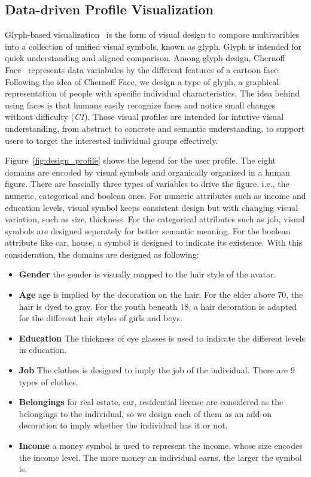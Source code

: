 \subsection{Data-driven Profile Visualization}

Glyph-based visualization~\cite{borgo2013glyph} is the form of visual design to compose multivaribles into a collection of unified visual symbols, known as glyph. Glyph is intended for quick understanding and aligned comparison. Among glyph design, Chernoff Face~\cite{chernoff1973use} represents data variabules by the different features of a cartoon face. Following the idea of Chernoff Face, we design a type of glyph, a graphical representation of people with specific individual characteristics. The idea behind using faces is that humans easily recognize faces and notice small changes without difficulty (\textit{C1}). Those visual profiles are intended for intutive visual understanding, from abstract to concrete and semantic understanding, to support users to target the interested individual groups effectively.

Figure~\ref{fig:design_profile} shows the legend for the user profile. The eight domains are encoded by visual symbols and organically organized in a human figure. There are bascially three types of variables to drive the figure, i.e., the numeric, categorical and boolean ones. For numeric attributes such as income and education levels, visual symbol keeps consistent design but with changing visual variation, such as size, thickness. For the categorical attributes such as job, visual symbols are designed seperately for better semantic meaning. For the boolean attribute like car, house, a symbol is designed to indicate its existence. With this consideration, the domains are designed as following:



\begin{itemize}
\item \textbf{Gender} the gender is visually mapped to the hair style of the avatar. 
\item \textbf{Age} age is implied by the decoration on the hair. For the elder above 70, the hair is dyed to gray. For the youth beneath 18, a hair decoration is adapted for the different hair styles of girls and boys.
\item \textbf{Education} The thickness of eye glasses is used to indicate the different levels in education.
\item \textbf{Job} The clothes is designed to imply the job of the individual. There are 9 types of clothes.
\item \textbf{Belongings} for real estate, car, residential license are considered as the belongings to the individual, so we design each of them as an add-on decoration to imply whether the individual has it or not.
\item \textbf{Income} a money symbol is used to represent the income, whose size encodes the income level. The more money an individual earns, the larger the symbol is.
\end{itemize} 

